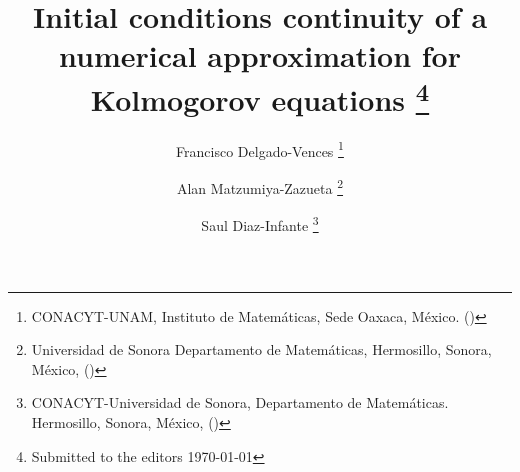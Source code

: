 \usepackage{lipsum}
\usepackage{amsfonts}
\usepackage{graphicx}
\usepackage{epstopdf}
\usepackage{algorithmic}
\usepackage[square, sort&compress, numbers]{natbib}
\usepackage[utf8x]{inputenc}
\usepackage{bm}
\usepackage{booktabs}
\usepackage{etoolbox}
\usepackage{todonotes}
\usepackage{epstopdf}
\usepackage{siunitx}
\usepackage{amsopn}
\patchcmd{\SetTagPlusEndMark}{$}{}{}{}
\patchcmd{\SetTagPlusEndMark}{$}{}{}{}
\ifpdf
\else
\fi

\newcommand{\creflastconjunction}{, and~}

\DeclareMathOperator{\diag}{diag}

\newcommand{\cqd}{\hfill$\Box$}
\newcommand{\f}{{\mathcal F}}
\newcommand{\IR}{{\mathbb R}}
\newcommand{\R}{{\mathbb R}}
\newcommand{\IN}{{\mathbb N}}
\newcommand{\ind}{\mbox{\Large$\chi$}}
\newcommand{\tor}{{\mathbb T}}
\newcommand{\G}{{\mathbb G}}
\newcommand{\beq}{\begin{equation}}
\newcommand{\eeq}{\end{equation}}
\newcommand{\bal}{\begin{align}}
\newcommand{\eal}{\end{align}}
\newcommand{\beqn}{\begin{equation*}}
\newcommand{\eeqn}{\end{equation*}}
\newcommand{\baln}{\begin{align*}}
\newcommand{\ealn}{\end{align*}}
\newcommand{\tbar}{\bar t}
\newcommand{\xbar}{\bar x}
\newcommand{\ep}{\epsilon}
\newcommand{\Pb}{\mathbb P}
\newcommand{\Rl}{\mathbb R}
\newcommand{\E}{\mathbb{E}}
\newcommand{\tf}{\mathcal{F}}
\newcommand{\hac}{\mathcal{H}}
\newcommand{\hact}{\mathcal{H}_T}


\title{%
    Initial conditions continuity of a numerical
    approximation for Kolmogorov equations
    \thanks{Submitted to the editors \today}
}
\author{
    Francisco Delgado-Vences
    \footnotemark[1]
    \thanks{
    CONACYT-UNAM, 
    Instituto de Matem\'aticas, 
    Sede Oaxaca, M\'exico.
    ()
    }
%
    \and %
    Alan Matzumiya-Zazueta
   \footnotemark[3]
    \thanks{
    Universidad de Sonora
    Departamento de Matem\'aticas,
    Hermosillo, Sonora, M\'exico,
    ()
    }
    \and %
    Saul Diaz-Infante
   \footnotemark[2]
    \thanks{%
    CONACYT-Universidad de Sonora, 
    Departamento de Matem\'aticas. 
    Hermosillo, Sonora, M\'exico,
    ()
    }
}

\DeclareMathOperator{\sech}{sech}
\ifpdf
\else
\fi


